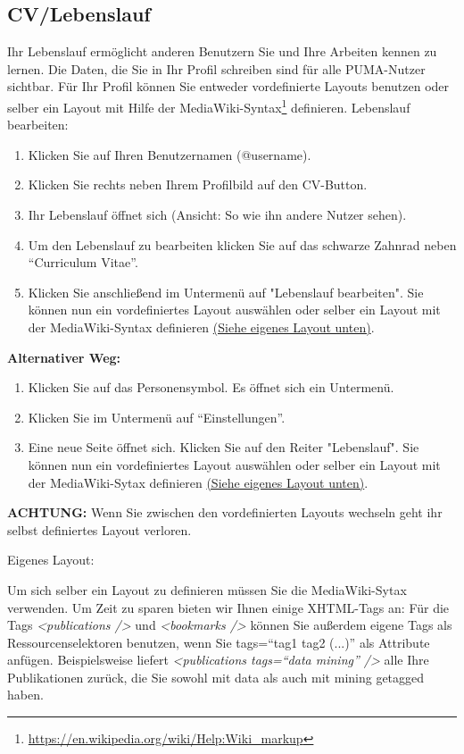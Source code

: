 \documentclass[b5paper,11pt,twoside]{scrbook} %
\begin{document}
\subsection{CV/Lebenslauf}
Ihr Lebenslauf ermöglicht anderen Benutzern Sie und Ihre Arbeiten kennen zu lernen. Die Daten, die Sie in Ihr Profil schreiben sind für alle PUMA-Nutzer sichtbar. Für Ihr Profil können Sie entweder vordefinierte Layouts benutzen oder selber ein Layout mit Hilfe der MediaWiki-Syntax\footnote{\url{https://en.wikipedia.org/wiki/Help:Wiki_markup}} definieren. 
\newline
\newline
Lebenslauf bearbeiten:
\begin{enumerate}
    \item Klicken Sie auf Ihren Benutzernamen (@username).
    \item Klicken Sie rechts neben Ihrem Profilbild auf den CV-Button.
    \item Ihr Lebenslauf öffnet sich (Ansicht: So wie ihn andere Nutzer sehen).
    \item Um den Lebenslauf zu bearbeiten klicken Sie auf das schwarze Zahnrad neben \enquote{Curriculum Vitae}.
    \item Klicken Sie anschließend im Untermenü auf "Lebenslauf bearbeiten". Sie können nun ein vordefiniertes Layout auswählen oder selber ein Layout mit der MediaWiki-Syntax definieren \hyperlink{Eigenes Layout}{(Siehe eigenes Layout unten)}.%
\end{enumerate}
\textbf{Alternativer Weg:} 
\begin{enumerate}
    \item Klicken Sie auf das Personensymbol. Es öffnet sich ein Untermenü.
    \item Klicken Sie im Untermenü auf \enquote{Einstellungen}.
    \item Eine neue Seite öffnet sich. Klicken Sie auf den Reiter "Lebenslauf". Sie können nun ein vordefiniertes Layout auswählen oder selber ein Layout mit der MediaWiki-Sytax definieren \hyperlink{Eigenes Layout}{(Siehe eigenes Layout unten)}.%
\end{enumerate}

\begin{shaded}
\textbf{ACHTUNG:} Wenn Sie zwischen den vordefinierten Layouts wechseln geht ihr selbst definiertes Layout verloren. 
\end{shaded}


\hypertarget{Eigenes Layout}{Eigenes Layout:}
\newline
Um sich selber ein Layout zu definieren müssen Sie die MediaWiki-Sytax verwenden. Um Zeit zu sparen bieten wir Ihnen einige XHTML-Tags an: %
\newline
Für die Tags \textit{<publications />} und \textit{<bookmarks />} können Sie außerdem eigene Tags als Ressourcenselektoren benutzen, wenn Sie tags=\enquote{tag1 tag2 (...)} als Attribute anfügen. Beispielsweise liefert \textit{<publications tags=\enquote{data mining} />} alle Ihre Publikationen zurück, die Sie sowohl mit data als auch mit mining getagged haben. 
\end{document}
